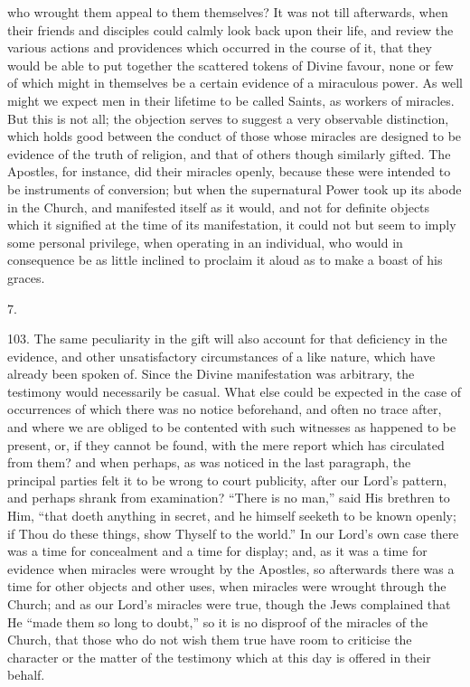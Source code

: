who wrought them appeal to them themselves? It was not till
afterwards, when their friends and disciples could calmly look back
upon their life, and review the various actions and providences which
occurred in the course of it, that they would be able to put together
the scattered tokens of Divine favour, none or few of which might in
themselves be a certain evidence of a miraculous power. As well might
we expect men in their lifetime to be called Saints, as workers of
miracles. But this is not all; the objection serves to suggest a very
observable distinction, which holds good between the conduct of those
whose miracles are designed to be evidence of the truth of religion,
and that of others though similarly gifted. The Apostles, for
instance, did their miracles openly, because these were intended to be
instruments of conversion; but when the supernatural Power took up its
abode in the Church, and manifested itself as it would, and not for
definite objects which it signified at the time of its manifestation,
it could not but seem to imply some personal privilege, when operating
in an individual, who would in consequence be as little inclined to
proclaim it aloud as to make a boast of his graces.

7.

103.
The same peculiarity in the gift will also account for that deficiency
in the evidence, and other unsatisfactory circumstances of a like
nature, which have already been spoken of. Since the Divine
manifestation was arbitrary, the testimony would necessarily be
casual. What else could be expected in the case of occurrences of
which there was no notice beforehand, and often no trace after, and
where we are obliged to be contented with such witnesses as happened
to be present, or, if they cannot be found, with the mere report which
has circulated from them? and when perhaps, as was noticed in the last
paragraph, the principal parties felt it to be wrong to court
publicity, after our Lord's pattern, and perhaps shrank from
examination? ``There is no man,'' said His brethren to Him, ``that doeth
anything in secret, and he himself seeketh to be known openly; if Thou
do these things, show Thyself to the world.'' In our Lord's own case
there was a time for concealment and a time for display; and, as it
was a time for evidence when miracles were wrought by the Apostles, so
afterwards there was a time for other objects and other uses, when
miracles were wrought through the Church; and as our Lord's miracles
were true, though the Jews complained that He ``made them so long to
doubt,'' so it is no disproof of the miracles of the Church, that those
who do not wish them true have room to criticise the character
or the matter of the testimony which at this day is offered in their
behalf.

